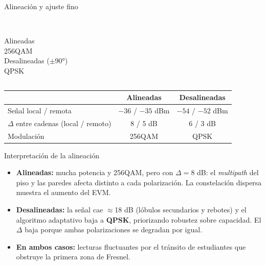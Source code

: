 \begin{frame}{Alineación y ajuste fino}
  \begin{columns}[c]
    \centering
    \\ {\scriptsize Alineadas}
    \centering
    \\ {\scriptsize 256QAM}
    \centering
    \\ {\scriptsize Desalineadas ($\pm$90°)}
    \centering
    \\ {\scriptsize QPSK}
  \end{columns}
  \vspace{4pt}
  \centering\small
  \begin{tabular}{@{}lcc@{}}
    \toprule
     & \textbf{Alineadas} & \textbf{Desalineadas} \\ \midrule
    Señal local / remota & $-36$ / $-35$ dBm & $-54$ / $-52$ dBm \\
    $\Delta$ entre cadenas (local / remoto) & 8 / 5 dB & 6 / 3 dB \\
    Modulación & 256QAM & QPSK \\
    \bottomrule
  \end{tabular}
\end{frame}

\begin{frame}{Interpretación de la alineación}
  \begin{itemize}
    \item \textbf{Alineadas:} mucha potencia y 256QAM, pero con $\Delta=8$ dB: el
          \emph{multipath} del piso y las paredes afecta distinto a cada polarización.
          La constelación dispersa muestra el aumento del EVM.
    \item \textbf{Desalineadas:} la señal cae $\approx$18 dB (lóbulos secundarios y rebotes) y
          el algoritmo adaptativo baja a \textbf{QPSK}, priorizando robustez sobre capacidad.
          El $\Delta$ baja porque ambas polarizaciones se degradan por igual.
    \item \textbf{En ambos casos:} lecturas fluctuantes por el tránsito de estudiantes que
          obstruye la primera zona de Fresnel.
  \end{itemize}
\end{frame}

